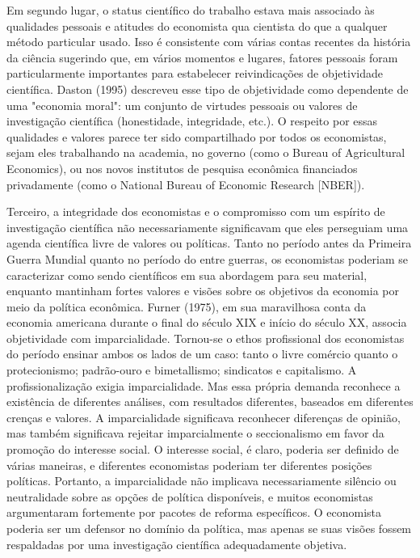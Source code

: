 \documentclass[a4paper,12pt]{article}[abntex2]
\begin{document}
Em segundo lugar, o status científico do trabalho estava mais associado às qualidades pessoais e atitudes do economista qua cientista do que a qualquer método particular usado. Isso é consistente com várias contas recentes da história da ciência sugerindo que, em vários momentos e lugares, fatores pessoais foram particularmente importantes para estabelecer reivindicações de objetividade científica. Daston (1995) descreveu esse tipo de objetividade como dependente de uma "economia moral": um conjunto de virtudes pessoais ou valores de investigação científica (honestidade, integridade, etc.). O respeito por essas qualidades e valores parece ter sido compartilhado por todos os economistas, sejam eles trabalhando na academia, no governo (como o Bureau of Agricultural Economics), ou nos novos institutos de pesquisa econômica financiados privadamente (como o National Bureau of Economic Research [NBER]).

Terceiro, a integridade dos economistas e o compromisso com um espírito de investigação científica não necessariamente significavam que eles perseguiam uma agenda científica livre de valores ou políticas. Tanto no período antes da Primeira Guerra Mundial quanto no período do entre guerras, os economistas poderiam se caracterizar como sendo científicos em sua abordagem para seu material, enquanto mantinham fortes valores e visões sobre os objetivos da economia por meio da política econômica. Furner (1975), em sua maravilhosa conta da economia americana durante o final do século XIX e início do século XX, associa objetividade com imparcialidade. Tornou-se o ethos profissional dos economistas do período ensinar ambos os lados de um caso: tanto o livre comércio quanto o protecionismo; padrão-ouro e bimetallismo; sindicatos e capitalismo. A profissionalização exigia imparcialidade. Mas essa própria demanda reconhece a existência de diferentes análises, com resultados diferentes, baseados em diferentes crenças e valores. A imparcialidade significava reconhecer diferenças de opinião, mas também significava rejeitar imparcialmente o seccionalismo em favor da promoção do interesse social. O interesse social, é claro, poderia ser definido de várias maneiras, e diferentes economistas poderiam ter diferentes posições políticas. Portanto, a imparcialidade não implicava necessariamente silêncio ou neutralidade sobre as opções de política disponíveis, e muitos economistas argumentaram fortemente por pacotes de reforma específicos. O economista poderia ser um defensor no domínio da política, mas apenas se suas visões fossem respaldadas por uma investigação científica adequadamente objetiva.
\end{document}
